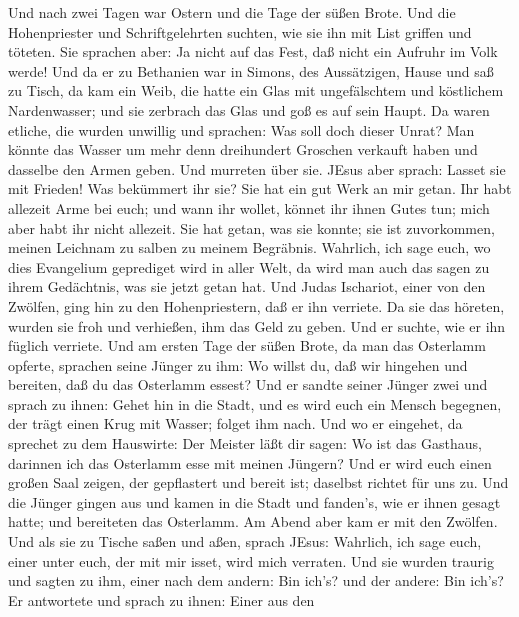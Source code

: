  Und nach zwei Tagen war Ostern und die Tage der süßen
Brote. Und die Hohenpriester und Schriftgelehrten suchten, wie sie ihn
mit List griffen und töteten.  Sie sprachen aber: Ja nicht
auf das Fest, daß nicht ein Aufruhr im Volk werde!  Und da
er zu Bethanien war in Simons, des Aussätzigen, Hause und saß zu Tisch,
da kam ein Weib, die hatte ein Glas mit ungefälschtem und köstlichem
Nardenwasser; und sie zerbrach das Glas und goß es auf sein Haupt.
 Da waren etliche, die wurden unwillig und sprachen: Was
soll doch dieser Unrat?  Man könnte das Wasser um mehr denn
dreihundert Groschen verkauft haben und dasselbe den Armen geben. Und
murreten über sie.  JEsus aber sprach: Lasset sie mit
Frieden! Was bekümmert ihr sie? Sie hat ein gut Werk an mir getan.
 Ihr habt allezeit Arme bei euch; und wann ihr wollet,
könnet ihr ihnen Gutes tun; mich aber habt ihr nicht allezeit.
 Sie hat getan, was sie konnte; sie ist zuvorkommen, meinen
Leichnam zu salben zu meinem Begräbnis.  Wahrlich, ich sage
euch, wo dies Evangelium geprediget wird in aller Welt, da wird man auch
das sagen zu ihrem Gedächtnis, was sie jetzt getan hat. 
Und Judas Ischariot, einer von den Zwölfen, ging hin zu den
Hohenpriestern, daß er ihn verriete.  Da sie das höreten,
wurden sie froh und verhießen, ihm das Geld zu geben. Und er suchte, wie
er ihn füglich verriete.  Und am ersten Tage der süßen
Brote, da man das Osterlamm opferte, sprachen seine Jünger zu ihm: Wo
willst du, daß wir hingehen und bereiten, daß du das Osterlamm essest?
 Und er sandte seiner Jünger zwei und sprach zu ihnen:
Gehet hin in die Stadt, und es wird euch ein Mensch begegnen, der trägt
einen Krug mit Wasser; folget ihm nach.  Und wo er
eingehet, da sprechet zu dem Hauswirte: Der Meister läßt dir sagen: Wo
ist das Gasthaus, darinnen ich das Osterlamm esse mit meinen Jüngern?
 Und er wird euch einen großen Saal zeigen, der gepflastert
und bereit ist; daselbst richtet für uns zu.  Und die
Jünger gingen aus und kamen in die Stadt und fanden's, wie er ihnen
gesagt hatte; und bereiteten das Osterlamm.  Am Abend aber
kam er mit den Zwölfen.  Und als sie zu Tische saßen und
aßen, sprach JEsus: Wahrlich, ich sage euch, einer unter euch, der mit
mir isset, wird mich verraten.  Und sie wurden traurig und
sagten zu ihm, einer nach dem andern: Bin ich's? und der andere: Bin
ich's?  Er antwortete und sprach zu ihnen: Einer aus den

